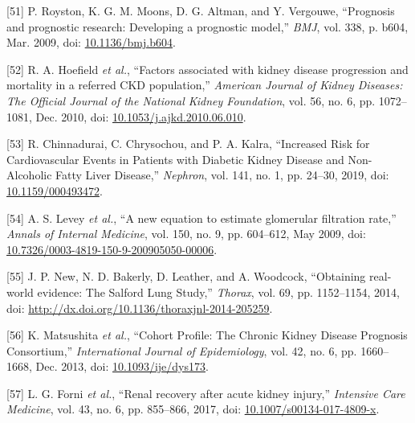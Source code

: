 \documentclass[12pt,twoside]{reedthesis}
\newenvironment{cslreferences}%
  {}%
  {\par}
\begin{document}
\begin{cslreferences}
\leavevmode\hypertarget{ref-royston_prognosis_2009}{}%
{[}51{]} P. Royston, K. G. M. Moons, D. G. Altman, and Y. Vergouwe, ``Prognosis and prognostic research: Developing a prognostic model,'' \emph{BMJ}, vol. 338, p. b604, Mar. 2009, doi: \href{https://doi.org/10.1136/bmj.b604}{10.1136/bmj.b604}.

\leavevmode\hypertarget{ref-hoefield_factors_2010}{}%
{[}52{]} R. A. Hoefield \emph{et al.}, ``Factors associated with kidney disease progression and mortality in a referred CKD population,'' \emph{American Journal of Kidney Diseases: The Official Journal of the National Kidney Foundation}, vol. 56, no. 6, pp. 1072--1081, Dec. 2010, doi: \href{https://doi.org/10.1053/j.ajkd.2010.06.010}{10.1053/j.ajkd.2010.06.010}.

\leavevmode\hypertarget{ref-chinnadurai_increased_2019-1}{}%
{[}53{]} R. Chinnadurai, C. Chrysochou, and P. A. Kalra, ``Increased Risk for Cardiovascular Events in Patients with Diabetic Kidney Disease and Non-Alcoholic Fatty Liver Disease,'' \emph{Nephron}, vol. 141, no. 1, pp. 24--30, 2019, doi: \href{https://doi.org/10.1159/000493472}{10.1159/000493472}.

\leavevmode\hypertarget{ref-levey_new_2009}{}%
{[}54{]} A. S. Levey \emph{et al.}, ``A new equation to estimate glomerular filtration rate,'' \emph{Annals of Internal Medicine}, vol. 150, no. 9, pp. 604--612, May 2009, doi: \href{https://doi.org/10.7326/0003-4819-150-9-200905050-00006}{10.7326/0003-4819-150-9-200905050-00006}.

\leavevmode\hypertarget{ref-new_obtaining_2014}{}%
{[}55{]} J. P. New, N. D. Bakerly, D. Leather, and A. Woodcock, ``Obtaining real-world evidence: The Salford Lung Study,'' \emph{Thorax}, vol. 69, pp. 1152--1154, 2014, doi: \href{https://doi.org/http://dx.doi.org/10.1136/thoraxjnl-2014-205259}{http://dx.doi.org/10.1136/thoraxjnl-2014-205259}.

\leavevmode\hypertarget{ref-matsushita_cohort_2013}{}%
{[}56{]} K. Matsushita \emph{et al.}, ``Cohort Profile: The Chronic Kidney Disease Prognosis Consortium,'' \emph{International Journal of Epidemiology}, vol. 42, no. 6, pp. 1660--1668, Dec. 2013, doi: \href{https://doi.org/10.1093/ije/dys173}{10.1093/ije/dys173}.

\leavevmode\hypertarget{ref-forni_renal_2017-1}{}%
{[}57{]} L. G. Forni \emph{et al.}, ``Renal recovery after acute kidney injury,'' \emph{Intensive Care Medicine}, vol. 43, no. 6, pp. 855--866, 2017, doi: \href{https://doi.org/10.1007/s00134-017-4809-x}{10.1007/s00134-017-4809-x}.


\end{cslreferences}
\end{document}
